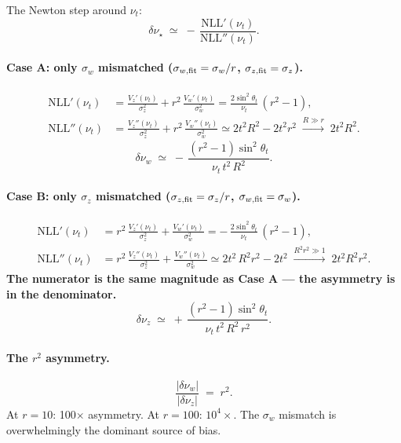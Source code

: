 \documentclass[11pt]{article}
\begin{document}
The Newton step around $\nu_t$:
\begin{equation}
\delta\nu_\star \;\simeq\; -\,\frac{\mathrm{NLL}'(\nu_t)}{\mathrm{NLL}''(\nu_t)}.
\label{eq:newton}
\end{equation}

\paragraph{Case A: only $\sigma_w$ mismatched ($\sigma_{w,\rm fit}=\sigma_w/r$, $\sigma_{z,\rm fit}=\sigma_z$).}
\begin{align}
\mathrm{NLL}'(\nu_t) &= \frac{V_z'(\nu_t)}{\sigma_z^2} + r^2\,\frac{V_w'(\nu_t)}{\sigma_w^2}
= \frac{2\sin^2\theta_t}{\nu_t}\,(r^2 - 1),\\[4pt]
\mathrm{NLL}''(\nu_t) &= \frac{V_z''(\nu_t)}{\sigma_z^2} + r^2\,\frac{V_w''(\nu_t)}{\sigma_w^2}
\simeq 2t^2 R^2 - 2t^2 r^2 \;\xrightarrow{R\gg r}\; 2t^2 R^2.
\end{align}
\begin{equation}
\boxed{\;
\delta\nu_w \;\simeq\; -\,\frac{(r^2-1)\sin^2\theta_t}{\nu_t\,t^2\,R^2}.
\;}
\label{eq:dnuw}
\end{equation}

\paragraph{Case B: only $\sigma_z$ mismatched ($\sigma_{z,\rm fit}=\sigma_z/r$, $\sigma_{w,\rm fit}=\sigma_w$).}
\begin{align}
\mathrm{NLL}'(\nu_t) &= r^2\,\frac{V_z'(\nu_t)}{\sigma_z^2} + \frac{V_w'(\nu_t)}{\sigma_w^2}
= -\,\frac{2\sin^2\theta_t}{\nu_t}\,(r^2 - 1),\\[4pt]
\mathrm{NLL}''(\nu_t) &= r^2\,\frac{V_z''(\nu_t)}{\sigma_z^2} + \frac{V_w''(\nu_t)}{\sigma_w^2}
\simeq 2t^2\,R^2 r^2 - 2t^2 \;\xrightarrow{R^2 r^2 \gg 1}\; 2t^2 R^2 r^2.
\end{align}
\textbf{The numerator is the same magnitude as Case A — the asymmetry is in the
denominator.}
\begin{equation}
\boxed{\;
\delta\nu_z \;\simeq\; +\,\frac{(r^2-1)\sin^2\theta_t}{\nu_t\,t^2\,R^2\,r^2}.
\;}
\label{eq:dnuz}
\end{equation}

\paragraph{The $r^2$ asymmetry.}
\begin{equation}
\boxed{\;
\frac{|\delta\nu_w|}{|\delta\nu_z|} \;=\; r^2.
\;}
\label{eq:rsq-asymmetry}
\end{equation}
At $r=10$: 100$\times$ asymmetry. At $r=100$: $10^4\times$. The $\sigma_w$ mismatch is
overwhelmingly the dominant source of bias.
\end{document}
